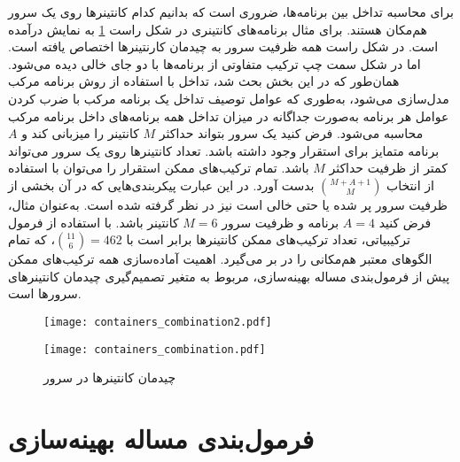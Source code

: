 برای محاسبه تداخل بین برنامه‌ها، ضروری است که بدانیم کدام کانتینرها روی یک سرور هم‌مکان هستند. برای مثال برنامه‌های کانتینری در شکل راست \ref{figure:containers_combination} به نمایش درآمده است. در شکل راست همه ظرفیت سرور به چیدمان کارنتینرها اختصاص یافته است. اما در شکل سمت چپ ترکیب متفاوتی از برنامه‌ها با دو جای خالی دیده می‌شود. همان‌طور که در این بخش بحث شد، تداخل با استفاده از روش برنامه مرکب مدل‌سازی می‌شود، به‌طوری که عوامل توصیف تداخل یک برنامه مرکب با ضرب کردن عوامل هر برنامه به‌صورت جداگانه در میزان تداخل همه برنامه‌های داخل برنامه مرکب محاسبه می‌شود. فرض کنید یک سرور بتواند حداکثر $M$ کانتینر را میزبانی کند و $A$ برنامه متمایز برای استقرار وجود داشته باشد. تعداد کانتینرها روی یک سرور می‌تواند کمتر از ظرفیت حداکثر $M$ باشد. تمام ترکیب‌های ممکن استقرار را می‌توان با استفاده از انتخاب $\binom{M+A+1}{M}$ بدست آورد. در این عبارت پیکربندی‌هایی که در آن بخشی از ظرفیت سرور پر شده یا حتی خالی است نیز در نظر گرفته شده است. به‌عنوان مثال، فرض کنید $A=4$ برنامه و ظرفیت سرور $M=6$ کانتینر باشد. با استفاده از فرمول ترکیبیاتی، تعداد ترکیب‌های ممکن کانتینرها برابر است با $\binom{11}{6}=462$، که تمام الگوهای معتبر هم‌مکانی را در بر می‌گیرد. اهمیت آماده‌سازی همه ترکیب‌های ممکن پیش از فرمول‌بندی مساله بهینه‌سازی، مربوط به متغیر تصمیم‌گیری چیدمان کانتینرهای سرورها است.

\vspace{0.5cm}
\begin{figure}[h]
\begin{minipage}{0.45\textwidth}
\centering
\texttt{[image: containers\_combination2.pdf]}
\end{minipage}\hfill
\begin{minipage}{0.45\textwidth}
\centering
\texttt{[image: containers\_combination.pdf]}
\end{minipage}\hfill
\caption{چیدمان کانتینرها در سرور}
\label{figure:containers_combination}
\end{figure}
\vspace{0.5cm}

\section{فرمول‌بندی مساله بهینه‌سازی}

